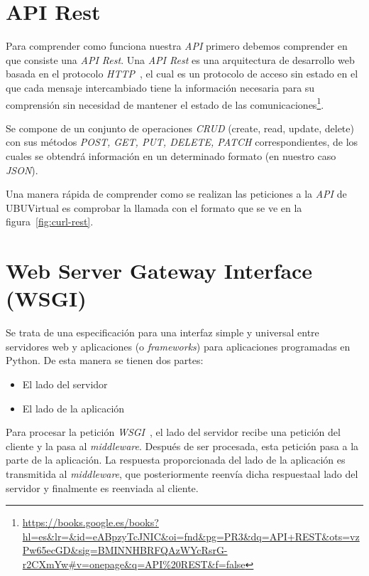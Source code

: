 
\section{API Rest}\label{sec:api-rest}
Para comprender como funciona nuestra \textit{API} primero debemos comprender en que consiste una \textit{API Rest}. Una \textit{API Rest} es una arquitectura de desarrollo web basada en el protocolo \textit{HTTP}~\cite{wiki:http}, el cual es un protocolo de acceso sin estado en el que cada mensaje intercambiado tiene la información necesaria para su comprensión sin necesidad de mantener el estado de las comunicaciones\footnote{\url{https://books.google.es/books?hl=es\&lr=\&id=eABpzyTcJNIC\&oi=fnd\&pg=PR3\&dq=API+REST\&ots=vzPw65ecGD\&sig=BMINNHBRFQAzWYcRsrG-r2CXmYw\#v=onepage\&q=API\%20REST\&f=false}}.

Se compone de un conjunto de operaciones \textit{CRUD} (create, read, update, delete) con sus métodos \textit{POST, GET, PUT, DELETE, PATCH} correspondientes, de los cuales se obtendrá información en un determinado formato (en nuestro caso \textit{JSON}).

Una manera rápida de comprender como se realizan las peticiones a la \textit{API} de UBUVirtual es comprobar la llamada con el formato que se ve en la figura~\ref{fig:curl-rest}.

\section{Web Server Gateway Interface (WSGI)}\label{sec:wsgi}
Se trata de una especificación para una interfaz simple y universal entre servidores web y aplicaciones (o \textit{frameworks}) para aplicaciones programadas en Python.
De esta manera se tienen dos partes:
\begin{itemize}
	\item El lado del servidor
	\item El lado de la aplicación
\end{itemize}
Para procesar la petición \textit{WSGI}~\cite{wiki:wsgi}, el lado del servidor recibe una petición del cliente y la pasa al \textit{middleware}. Después de ser procesada, esta petición pasa a la parte de la aplicación. La respuesta proporcionada del lado de la aplicación es transmitida al \textit{middleware}, que posteriormente reenvía dicha respuestaal lado del servidor y finalmente es reenviada al cliente.

